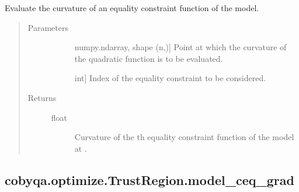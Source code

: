 \documentclass[letterpaper,10pt,english]{sphinxmanual}
\begin{document}
\begin{fulllineitems}
\begin{fulllineitems}
\label{\detokenize{refs/generated/cobyqa.optimize.TrustRegion.model_ceq_curv:cobyqa.optimize.TrustRegion.model_ceq_curv}}
\sphinxAtStartPar
Evaluate the curvature of an equality constraint function of the model.
\begin{quote}\begin{description}
\item[{Parameters}] \leavevmode\begin{description}
\item[{}] \leavevmode{[}numpy.ndarray, shape (n,){]}
\sphinxAtStartPar
Point at which the curvature of the quadratic function is to be
evaluated.

\item[{}] \leavevmode{[}int{]}
\sphinxAtStartPar
Index of the equality constraint to be considered.

\end{description}

\item[{Returns}] \leavevmode\begin{description}
\item[{float}] \leavevmode
\sphinxAtStartPar
Curvature of the \sphinxhyphen{}th equality constraint function of the model at
.

\end{description}

\end{description}\end{quote}

\end{fulllineitems}



\subsection{cobyqa.optimize.TrustRegion.model\_ceq\_grad}
\label{\detokenize{refs/generated/cobyqa.optimize.TrustRegion.model_ceq_grad:cobyqa-optimize-trustregion-model-ceq-grad}}\label{\detokenize{refs/generated/cobyqa.optimize.TrustRegion.model_ceq_grad::doc}}


\end{fulllineitems}
\end{document}
